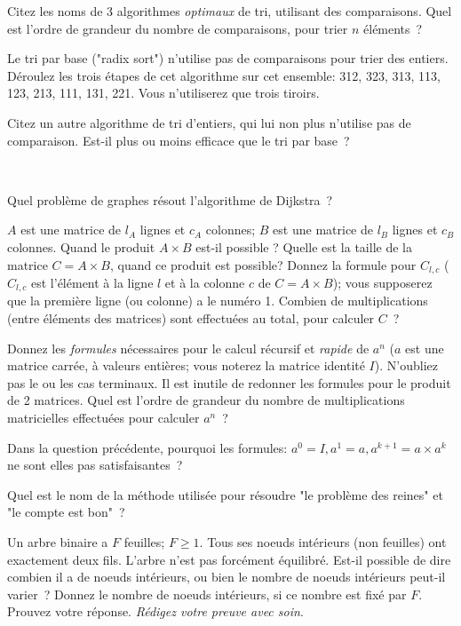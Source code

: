 \documentclass[11pt]{article}
\begin{document}
{ {Citez les noms de 3 algorithmes {\it  optimaux}  de tri, utilisant des comparaisons. Quel est l'ordre de grandeur du nombre de comparaisons, pour trier $n$ éléments~?}
~



 {Le tri par base ("radix sort") n'utilise pas de comparaisons pour trier des entiers.
Déroulez les trois étapes de cet algorithme sur cet ensemble: 312, 323, 313, 113, 123, 213, 111, 131, 221. Vous n'utiliserez que trois tiroirs.}
~

 {Citez un autre algorithme de tri d'entiers, qui lui non plus n'utilise pas de comparaison. Est-il plus ou moins efficace que le tri par base~?}

~



 Quel problème de graphes résout  l'algorithme de Dijkstra~?
~



 {$A$ est une matrice de $l_A$ lignes et $c_A$ colonnes; $B$ est une matrice
de $l_B$ lignes et $c_B$ colonnes. Quand le produit $A\times  B$ est-il possible ?
Quelle est la taille de la matrice $C=A\times B$, quand ce produit est possible? 
Donnez la formule pour $C_{l,c}$ ($C_{l,c}$ est l'élément à la ligne 
$l$ et à la colonne $c$ de 
$C=A\times B$); vous supposerez que la première ligne (ou colonne) a le numéro 1.
Combien de multiplications (entre éléments des matrices) sont effectuées au total, 
pour calculer $C$~?
~


 {Donnez les {\it formules} n\'ecessaires pour le calcul r\'ecursif 
et {\it rapide} de $a^n$ ($a$ est une matrice carrée, à valeurs enti\`eres;  
vous noterez la matrice identité $I$). N'oubliez pas le ou les cas terminaux. 
Il est inutile de redonner les formules pour le produit de 2 matrices. 
Quel est l'ordre de grandeur du 
nombre de multiplications  matricielles effectuées pour calculer $a^n$~?}  
~


 {Dans la question précédente, pourquoi les formules: $a^0=I, a^1=a, a^{k+1}=a \times a^k$ ne sont elles pas satisfaisantes~?}
~

 {Quel est le nom de la méthode utilisée pour résoudre "le problème des reines" et "le compte est bon"~?}
~


 Un arbre binaire a $F$ feuilles; $F\ge 1$. 
Tous ses noeuds intérieurs (non feuilles) ont exactement deux fils.
L'arbre n'est pas forcément équilibré. Est-il possible de dire combien 
il a de noeuds intérieurs, ou bien le nombre de noeuds intérieurs peut-il varier~?
Donnez le nombre de  noeuds intérieurs, si ce nombre est fixé par $F$. Prouvez votre réponse.
{\it Rédigez votre preuve  avec soin}.
~

}}
\end{document}
